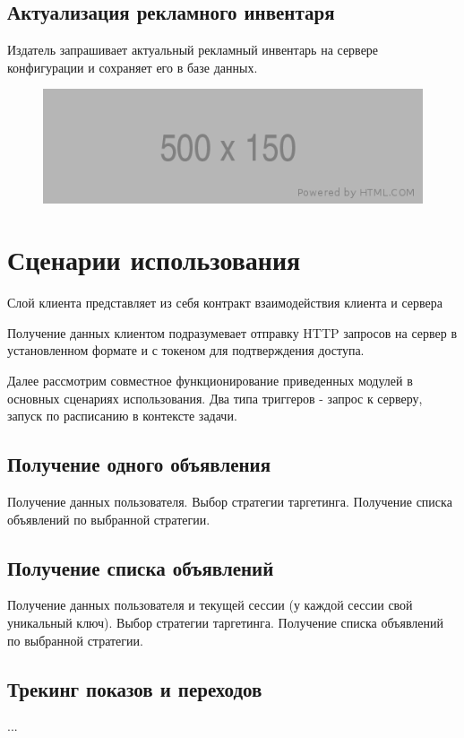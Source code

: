 \documentclass[times]{itmo-student-thesis}
\begin{document}
\subsection{Актуализация рекламного инвентаря}

Издатель запрашивает актуальный рекламный инвентарь на сервере конфигурации и сохраняет его в базе данных.

\begin{figure}[h]
\includegraphics[width=\textwidth]{placeholder}
\centering
\end{figure}

\section{Сценарии использования}

Слой клиента представляет из себя контракт взаимодействия клиента и сервера

Получение данных клиентом подразумевает отправку HTTP запросов  на сервер в установленном формате и с токеном для подтверждения доступа.

Далее рассмотрим совместное функционирование приведенных модулей в основных сценариях использования.
Два типа триггеров - запрос к серверу, запуск по расписанию в контексте задачи.

\subsection{Получение одного объявления}
Получение данных пользователя. 
Выбор стратегии таргетинга. 
Получение списка объявлений по выбранной стратегии.

\subsection{Получение списка объявлений}
Получение данных пользователя и текущей сессии (у каждой сессии свой уникальный ключ). 
Выбор стратегии таргетинга. 
Получение списка объявлений по выбранной стратегии.

\subsection{Трекинг показов и переходов}
...
\end{document}
